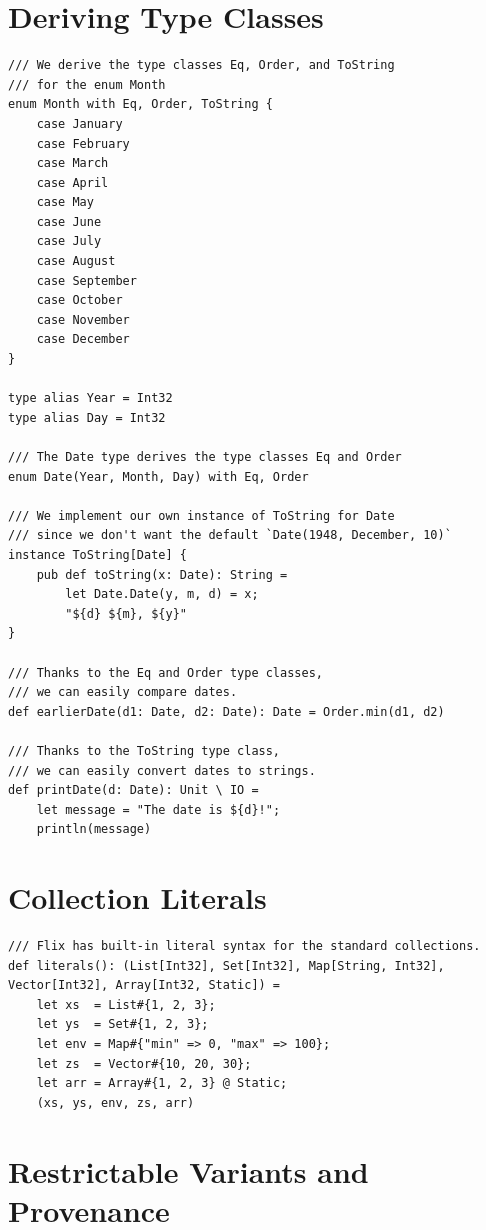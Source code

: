 \documentclass{article}
\begin{document}
\section{Deriving Type Classes}
\begin{lstlisting}
/// We derive the type classes Eq, Order, and ToString
/// for the enum Month
enum Month with Eq, Order, ToString {
    case January
    case February
    case March
    case April
    case May
    case June
    case July
    case August
    case September
    case October
    case November
    case December
}

type alias Year = Int32
type alias Day = Int32

/// The Date type derives the type classes Eq and Order
enum Date(Year, Month, Day) with Eq, Order

/// We implement our own instance of ToString for Date
/// since we don't want the default `Date(1948, December, 10)`
instance ToString[Date] {
    pub def toString(x: Date): String =
        let Date.Date(y, m, d) = x;
        "${d} ${m}, ${y}"
}

/// Thanks to the Eq and Order type classes,
/// we can easily compare dates.
def earlierDate(d1: Date, d2: Date): Date = Order.min(d1, d2)

/// Thanks to the ToString type class,
/// we can easily convert dates to strings.
def printDate(d: Date): Unit \ IO =
    let message = "The date is ${d}!";
    println(message)
\end{lstlisting}

\section{Collection Literals}

\begin{lstlisting}
/// Flix has built-in literal syntax for the standard collections.
def literals(): (List[Int32], Set[Int32], Map[String, Int32], Vector[Int32], Array[Int32, Static]) =
    let xs  = List#{1, 2, 3};
    let ys  = Set#{1, 2, 3};
    let env = Map#{"min" => 0, "max" => 100};
    let zs  = Vector#{10, 20, 30};
    let arr = Array#{1, 2, 3} @ Static;
    (xs, ys, env, zs, arr)
\end{lstlisting}

\section{Restrictable Variants and Provenance}
\end{document}
